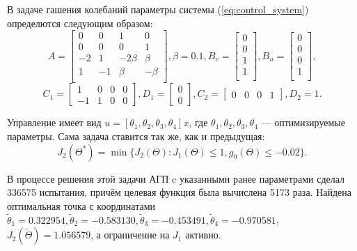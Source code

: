 В задаче гашения колебаний параметры системы (\ref{eq:control_system}) определются следующим
образом:
$$
A=\begin{bmatrix}
  0  & 0 & 1 & 0 \\
  0  & 0 & 0 & 1 \\
  -2  & 1 & -2\beta & \beta \\
  1  & -1 & \beta & -\beta \\
\end{bmatrix}, \beta = 0.1,
B_v=\begin{bmatrix}
0       \\
0       \\
1       \\
1       \\
\end{bmatrix},
B_u=\begin{bmatrix}
0       \\
0       \\
0       \\
1       \\
\end{bmatrix},
$$
$$
C_1=\begin{bmatrix}
1 & 0 & 0 & 0 \\
-1 & 1 & 0 & 0
\end{bmatrix},
D_1=\begin{bmatrix}
0 \\
0
\end{bmatrix},
C_2=\begin{bmatrix}
0 & 0 & 0  & 1
\end{bmatrix},D_2=1.
$$

Управление имеет вид \(u=[\theta_1,\theta_2, \theta_3,\theta_4]x\), где \(\theta_1,\theta_2, \theta_3,\theta_4\) ---
оптимизируемые параметры. Сама задача ставится так же, как и предыдущая:
\begin{displaymath}
  J_2(\Theta^*)=\min\{J_2(\Theta):J_1(\Theta)\leqslant 1, g_0(\Theta)\leqslant -0.02\}.
\end{displaymath}

В процессе решения этой задачи АГП c указанными ранее параметрами сделал 336575 испытания, причём целевая функция
была вычислена 5173 раза. Найдена оптимальная точка с координатами
\(\widetilde\theta_1 =0.322954,\widetilde\theta_2=-0.583130, \widetilde\theta_3=-0.453491, \widetilde\theta_4=-0.970581\),
\(J_2(\widetilde\Theta)=1.056579\), а ограничение на \(J_1\) активно.

